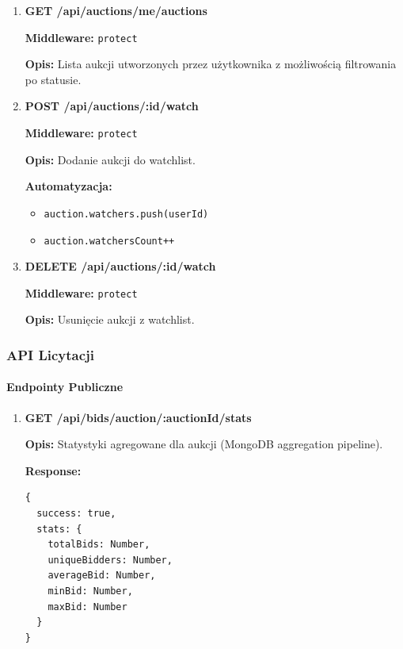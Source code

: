 \begin{enumerate}
        \textbf{Błędy:}
        \begin{itemize}
          \item \texttt{400} --- Kwota za niska
          \item \texttt{403} --- Licytacja własnej aukcji
          \item \texttt{404} --- Aukcja nie znaleziona
          \item \texttt{400} --- Aukcja nieaktywna
        \end{itemize}

  \item \textbf{GET /api/auctions/me/auctions}

        \textbf{Middleware:} \texttt{protect}

        \textbf{Opis:} Lista aukcji utworzonych przez użytkownika z możliwością filtrowania po statusie.

  \item \textbf{POST /api/auctions/:id/watch}

        \textbf{Middleware:} \texttt{protect}

        \textbf{Opis:} Dodanie aukcji do watchlist.

        \textbf{Automatyzacja:}
        \begin{itemize}
          \item \texttt{auction.watchers.push(userId)}
          \item \texttt{auction.watchersCount++}
        \end{itemize}

  \item \textbf{DELETE /api/auctions/:id/watch}

        \textbf{Middleware:} \texttt{protect}

        \textbf{Opis:} Usunięcie aukcji z watchlist.
\end{enumerate}

\subsubsection{API Licytacji}

\paragraph{Endpointy Publiczne}

\begin{enumerate}
  \item \textbf{GET /api/bids/auction/:auctionId/stats}

        \textbf{Opis:} Statystyki agregowane dla aukcji (MongoDB aggregation pipeline).

        \textbf{Response:}
        \begin{lstlisting}
{
  success: true,
  stats: {
    totalBids: Number,
    uniqueBidders: Number,
    averageBid: Number,
    minBid: Number,
    maxBid: Number
  }
}
\end{lstlisting}
\end{enumerate}

